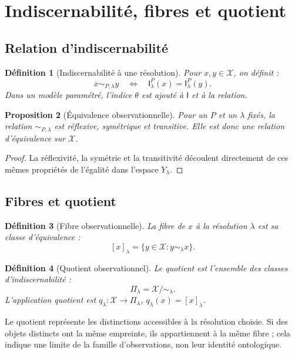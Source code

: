 \documentclass[11pt,a4paper]{article}
\newtheorem{definition}{Définition}[section]
\newtheorem{proposition}[definition]{Proposition}
\theoremstyle{remark}
\newcommand{\X}{\mathcal X}
\newcommand{\Emp}{\mathsf I}
\newcommand{\1}{\mathbf 1}
\begin{document}
\section{Indiscernabilité, fibres et quotient}

\subsection{Relation d'indiscernabilité}
\begin{definition}[Indiscernabilité à une résolution]
Pour $x,y\in\X$, on définit :
\[
x\sim_{P,\lambda}y
\quad\Longleftrightarrow\quad
\Emp^P_\lambda(x)=\Emp^P_\lambda(y).
\]
Dans un modèle paramétré, l'indice $\theta$ est ajouté à $\Emp$ et à la relation.
\end{definition}

\begin{proposition}[Équivalence observationnelle]
Pour un $P$ et un $\lambda$ fixés, la relation $\sim_{P,\lambda}$ est réflexive, symétrique et transitive. Elle est donc une relation d'équivalence sur $\X$.
\end{proposition}
\begin{proof}
La réflexivité, la symétrie et la transitivité découlent directement de ces mêmes propriétés de l'égalité dans l'espace $Y_\lambda$.
\end{proof}

\subsection{Fibres et quotient}
\begin{definition}[Fibre observationnelle]
La fibre de $x$ à la résolution $\lambda$ est sa classe d'équivalence :
\[
[x]_\lambda=\{y\in\X:y\sim_\lambda x\}.
\]
\end{definition}

\begin{definition}[Quotient observationnel]
Le quotient est l'ensemble des classes d'indiscernabilité :
\[
\Pi_\lambda=\X/\!\sim_\lambda.
\]
L'application quotient est $q_\lambda:\X\to\Pi_\lambda$, $q_\lambda(x)=[x]_\lambda$.
\end{definition}

Le quotient représente les distinctions accessibles à la résolution choisie. Si des objets distincts ont la même empreinte, ils appartiennent à la même fibre ; cela indique une limite de la famille d'observations, non leur identité ontologique.
\end{document}
